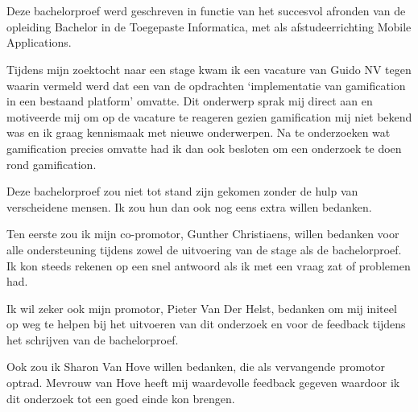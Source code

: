 
\chapter*{}
\label{ch:voorwoord}


Deze bachelorproef werd geschreven in functie van het succesvol afronden van de opleiding Bachelor in de Toegepaste Informatica, met als afstudeerrichting Mobile Applications.

Tijdens mijn zoektocht naar een stage kwam ik een vacature van Guido NV tegen waarin vermeld werd dat een van de opdrachten ‘implementatie van gamification in een bestaand platform’ omvatte. Dit onderwerp sprak mij direct aan en motiveerde mij om op de vacature te reageren gezien gamification mij niet bekend was en ik graag kennismaak met nieuwe onderwerpen. Na te onderzoeken wat gamification precies omvatte had ik dan ook besloten om een onderzoek te doen rond gamification.

Deze bachelorproef zou niet tot stand zijn gekomen zonder de hulp van verscheidene mensen. Ik zou hun dan ook nog eens extra willen bedanken.

Ten eerste zou ik mijn co-promotor, Gunther Christiaens, willen bedanken voor alle ondersteuning tijdens zowel de uitvoering van de stage als de bachelorproef. Ik kon steeds rekenen op een snel antwoord als ik met een vraag zat of problemen had.

Ik wil zeker ook mijn promotor, Pieter Van Der Helst, bedanken om mij initeel op weg te helpen bij het uitvoeren van dit onderzoek en voor de feedback tijdens het schrijven van de bachelorproef.

Ook zou ik Sharon Van Hove willen bedanken, die als vervangende promotor optrad. Mevrouw van Hove heeft mij waardevolle feedback gegeven waardoor ik dit onderzoek tot een goed einde kon brengen.


